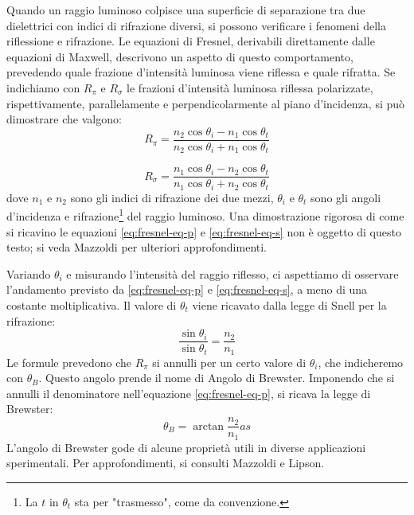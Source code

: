 Quando un raggio luminoso colpisce una superficie di separazione tra due
dielettrici con indici di rifrazione diversi, si possono verificare
i fenomeni della riflessione e rifrazione.
Le equazioni di Fresnel, derivabili direttamente dalle equazioni di Maxwell,
descrivono un aspetto di questo comportamento, prevedendo quale frazione d'intensità
luminosa viene riflessa e quale rifratta. Se indichiamo con $R_\pi$ e $R_\sigma$ le
frazioni d'intensità luminosa riflessa polarizzate, rispettivamente, parallelamente
e perpendicolarmente al piano d'incidenza, si può dimostrare che valgono:
%
\begin{equation}
  R_\pi = \frac {
    n_2 \cos{\theta_i} - n_1 \cos{\theta_t}
  } {
    n_2 \cos{\theta_i} + n_1 \cos{\theta_t}
  }\label{eq:fresnel-eq-p}
\end{equation}

\begin{equation}
  R_\sigma = \frac {
    n_1 \cos{\theta_i} - n_2 \cos{\theta_t}
  } {
    n_1 \cos{\theta_i} + n_2 \cos{\theta_t}
  }\label{eq:fresnel-eq-s}
\end{equation}
%
\noindent dove $n_1$ e $n_2$ sono gli indici di rifrazione dei due mezzi, $\theta_i$ e
$\theta_t$ sono gli angoli d'incidenza e rifrazione\footnote{La $t$ in $\theta_t$ sta per "trasmesso", come da convenzione.} del raggio luminoso.
Una dimostrazione rigorosa di come si ricavino le equazioni \eqref{eq:fresnel-eq-p} e \eqref{eq:fresnel-eq-s} non è oggetto
di questo testo;
si veda Mazzoldi\cite{mazzoldi98} per ulteriori approfondimenti.

Variando $\theta_i$ e misurando l’intensità del raggio riflesso,
ci aspettiamo di osservare l'andamento previsto da \eqref{eq:fresnel-eq-p} e \eqref{eq:fresnel-eq-s}, a meno di una
costante moltiplicativa.
Il valore di $\theta_t$ viene ricavato dalla legge di Snell per la rifrazione:
%
\begin{equation}
  \frac {\sin{\theta_i}} {\sin{\theta_t}} = \frac {n_2} {n_1}
  \label{eq:legge-snell}
\end{equation}
%
\noindent Le formule prevedono che $R_\pi$ si annulli per un certo valore di $\theta_i$,
che indicheremo con $\theta_B$.
Questo angolo prende il nome di Angolo di Brewster. Imponendo che si annulli il
denominatore nell'equazione \eqref{eq:fresnel-eq-p}, si ricava la legge di Brewster:
%
\begin{equation}
  \theta_B = \arctan{
    \frac {n_2} {n_1}as
  }\label{eq:legge-brewster}
\end{equation}
%
\noindent  L’angolo di Brewster gode di alcune proprietà utili in diverse applicazioni
sperimentali.
Per approfondimenti, si consulti Mazzoldi\cite{mazzoldi98} e Lipson\cite{lipson20}.
\endinput
